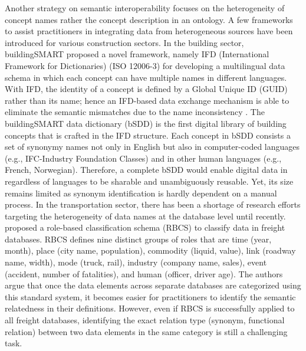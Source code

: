 \documentclass[Journal,InsideFigs, DoubleSpace]{ascelike} %
\begin{document}
Another strategy on semantic interoperability focuses on the heterogeneity of concept names rather the concept description in an ontology. A few frameworks to assist practitioners in integrating data from heterogeneous sources have been introduced for various construction sectors. In the building sector, buildingSMART proposed a novel framework, namely IFD (International Framework for Dictionaries) (ISO 12006-3) for developing a multilingual data schema in which each concept can have multiple names in different languages. With IFD, the identity of a concept is defined by a Global Unique ID (GUID) rather than its name; hence an IFD-based data exchange mechanism is able to eliminate the semantic mismatches due to the name inconsistency \cite{IFDgroup08,hezik08}. The buildingSMART data dictionary (bSDD) \cite{buildingsmartData} is the first digital library of building concepts that is crafted in the IFD structure. Each concept in bSDD consists a set of synonymy names not only in English but also in computer-coded languages (e.g., IFC-Industry Foundation Classes) and in other human languages (e.g., French, Norwegian). Therefore, a complete bSDD would enable digital data in regardless of languages to be sharable and unambiguously reusable. Yet, its size remains limited as synonym identification is hardly dependent on a manual process. In the transportation sector, there has been a shortage of research efforts targeting the heterogeneity of data names at the database level until recently.   proposed a role-based classification schema (RBCS) to classify data in freight databases. RBCS defines nine distinct groups of roles that are time (year, month), place (city name, population), commodity (liquid, value), link (roadway name, width), mode (truck, rail), industry (company name, sales), event (accident, number of fatalities), and human (officer, driver age). The authors argue that once the data elements across separate databases are categorized using this standard system, it becomes easier for practitioners to identify the semantic relatedness in their definitions. However, even if RBCS is successfully applied to all freight databases, identifying the exact relation type (synonym, functional relation) between two data elements in the same category is still a challenging task.
\par
\end{document}
